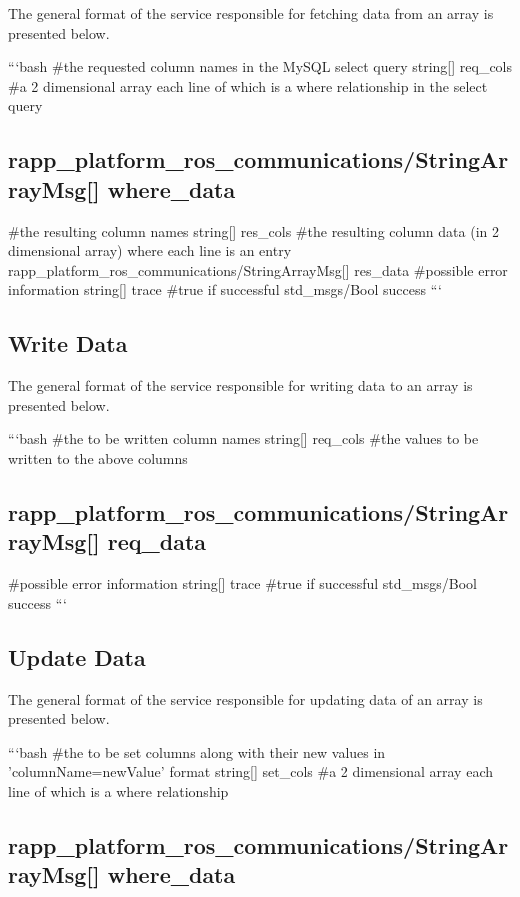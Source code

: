 The general format of the service responsible for fetching data from an array is presented below.

```bash \#the requested column names in the My\-S\-Q\-L select query string\mbox{[}\mbox{]} req\-\_\-cols \#a 2 dimensional array each line of which is a where relationship in the select query \subsection*{rapp\-\_\-platform\-\_\-ros\-\_\-communications/\-String\-Array\-Msg\mbox{[}\mbox{]} where\-\_\-data }

\#the resulting column names string\mbox{[}\mbox{]} res\-\_\-cols \#the resulting column data (in 2 dimensional array) where each line is an entry rapp\-\_\-platform\-\_\-ros\-\_\-communications/\-String\-Array\-Msg\mbox{[}\mbox{]} res\-\_\-data \#possible error information string\mbox{[}\mbox{]} trace \#true if successful std\-\_\-msgs/\-Bool success ```

\subsection*{Write Data}

The general format of the service responsible for writing data to an array is presented below.

```bash \#the to be written column names string\mbox{[}\mbox{]} req\-\_\-cols \#the values to be written to the above columns \subsection*{rapp\-\_\-platform\-\_\-ros\-\_\-communications/\-String\-Array\-Msg\mbox{[}\mbox{]} req\-\_\-data }

\#possible error information string\mbox{[}\mbox{]} trace \#true if successful std\-\_\-msgs/\-Bool success ```

\subsection*{Update Data}

The general format of the service responsible for updating data of an array is presented below.

```bash \#the to be set columns along with their new values in 'column\-Name=new\-Value' format string\mbox{[}\mbox{]} set\-\_\-cols \#a 2 dimensional array each line of which is a where relationship \subsection*{rapp\-\_\-platform\-\_\-ros\-\_\-communications/\-String\-Array\-Msg\mbox{[}\mbox{]} where\-\_\-data }

